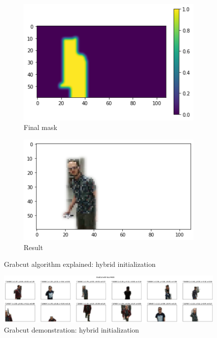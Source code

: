 \begin{figure}[!h]
\begin{center}
\begin{subfigure}[h]{0.24\textwidth}
			\includegraphics[width=1\textwidth]{"contents/images/04-2grabcut-3hybrid-steps-3"}
			\caption[]{Final mask}
			\label{fig:grabcut-hybrid-explain-3}
		\end{subfigure}
		\hfill
		\begin{subfigure}[h]{0.24\textwidth}
			\centering
			\includegraphics[width=1\textwidth]{"contents/images/04-2grabcut-3hybrid-steps-4"}
			\caption[]{Result}
			\label{fig:grabcut-hybrid-explain-4}
		\end{subfigure}
		\hfill
	\end{center}
	\vspace{-0.5cm}
	\caption[Grabcut algorithm explained: hybrid initialization]{Grabcut algorithm explained: hybrid initialization}
	\label{fig:grabcut-hybrid-explain}
\end{figure}

\begin{figure}[!h]
	\centering
	\includegraphics[width=1\textwidth]{"contents/images/04-2grabcut-3hybrid-final"}
	\caption[Grabcut demonstration: hybrid initialization]{Grabcut demonstration: hybrid initialization}
	\label{fig:grabcut-hybrid-example}
\end{figure}


